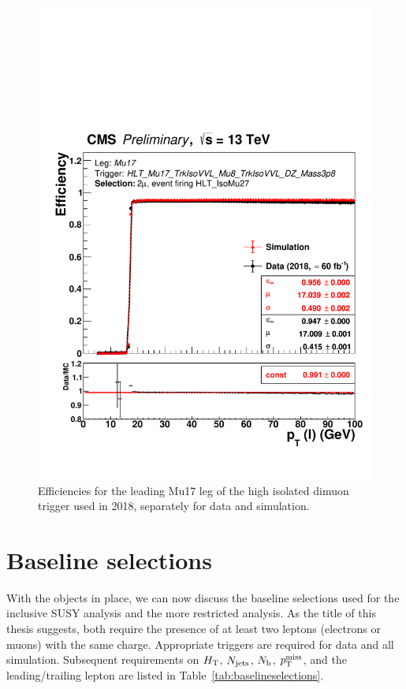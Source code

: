 \begin{figure}[!hbtp]
\centering
\includegraphics[width=.70\textwidth]{figs/ssan/eff_1d_mu17_2018}
\caption{
    Efficiencies for the leading Mu17 leg of the high \pt isolated 
    dimuon trigger used in 2018, separately for data and simulation.
}
\label{fig:triggermuonpt}
\end{figure}

\FloatBarrier

\section{Baseline selections}

With the objects in place, we can now discuss the baseline selections used for the 
inclusive SUSY analysis and the more restricted \smft analysis.
As the title of this thesis suggests, both require the presence of at least
two leptons (electrons or muons) with the same charge. 
Appropriate triggers are required for data and all simulation.
Subsequent
requirements on $H_{\mathrm{T}}$, $N_\text{jets}$, $N_\mathrm{b}$, $p_{\mathrm{T}}^\text{miss}$, and the leading/trailing lepton \pt are listed in 
Table~\ref{tab:baselineselections}.

